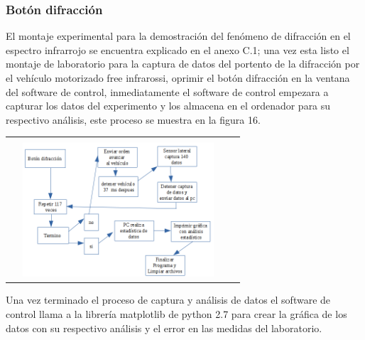 \documentclass[12]{article}
\newenvironment{Figure}
{\par\medskip\noindent\minipage{\linewidth}}
{\endminipage\par\medskip}
\begin{document}
\begin{multicols}{2}
\subsubsection{Botón difracción}
El montaje experimental para la demostración del fenómeno de difracción en el espectro infrarrojo se encuentra explicado en el anexo C.1; una vez esta listo el montaje de laboratorio para la captura de datos del portento de la difracción por el vehículo motorizado free infrarossi, oprimir el botón difracción en la ventana del software de control,  inmediatamente el software de control empezara a capturar los datos del experimento y los almacena en el ordenador para su respectivo análisis, este proceso se muestra en la figura 16.
\begin{Figure}	
\center
\begin{tabular}{|l|r|}
\hline\\
\includegraphics[width=8cm, height=5cm]{img/diagrama1.png} \\ \hline
\end{tabular}
\label{fig:g16}
\end{Figure}
Una vez terminado el proceso de captura y análisis de datos el software de control llama a la librería matplotlib de python 2.7 para crear la gráfica de los datos con su respectivo análisis y el error en las medidas del laboratorio.

\end{multicols}
\end{document}
